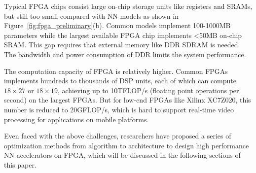 Typical FPGA chips consist large on-chip storage units like registers and SRAMs, but still too small compared with NN models as shown in Figure~\ref{fig:fpga_preliminary}(b). Common models implement 100-1000MB parameters while the largest available FPGA chip implements <50MB on-chip SRAM. This gap requires that external memory like DDR SDRAM is needed. The bandwidth and power consumption of DDR limits the system performance.

The computation capacity of FPGA is relatively higher. Common FPGAs implements hundreds to thousands of DSP units, each of which can compute $18\times 27$ or $18\times 19$, achieving up to 10TFLOP/s (floating point operations per second) on the largest FPGAs. But for low-end FPGAs like Xilinx XC7Z020, this number is reduced to 20GFLOP/s, which is hard to support real-time video processing for applications on mobile platforms. 

Even faced with the above challenges, researchers have proposed a series of optimization methods from algorithm to architecture to design high performance NN accelerators on FPGA, which will be discussed in the following sections of this paper.